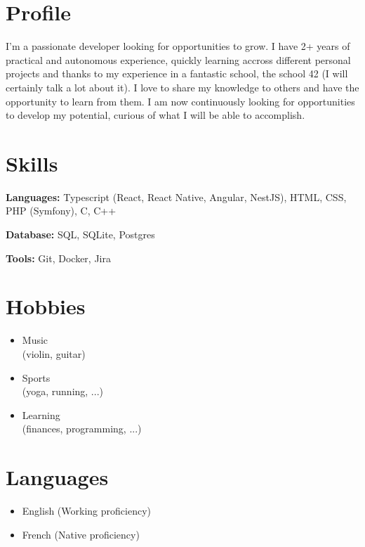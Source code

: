 \documentclass[11pt, oneside, a4paper, titlepage]{article}
\begin{document}
\vspace*{0.5cm}
\begin{tcolorbox}[colframe=white, colback=white]

  \begin{minipage}[t]{0.35\linewidth}

    \section*{Profile}
    I'm a passionate developer looking for
    opportunities to grow. I have 2+ years
    of practical and autonomous experience,
    quickly learning accross different 
    personal projects and thanks to my 
    experience in a fantastic school, 
    the school 42 (I will certainly talk
    a lot about it). \medbreak
    I love to share my knowledge to others 
    and have the opportunity to learn from 
    them. \medbreak
    I am now continuously looking for 
    opportunities to develop my potential, 
    curious of what I will be able to 
    accomplish.

    \section*{Skills}

    \small{
      \textbf{Languages: }Typescript (React, React Native, Angular, NestJS), 
      HTML, CSS, PHP (Symfony), C, C++
    }
    \vspace{0.3cm}
    
    \small{
      \textbf{Database: }SQL, SQLite, Postgres
    }
    \vspace{0.3cm}

    \small{
      \textbf{Tools: }Git, Docker, Jira
    }

    \section*{Hobbies}
    \begin{itemize}
      \item{Music \\(violin, guitar)}
      \item{Sports \\(yoga, running, ...)}
      \item{Learning \\(finances, programming, ...)}
    \end{itemize}

    \section*{Languages}
    \begin{itemize}
      \item{English (Working proficiency)}
      \item{French (Native proficiency)}
    \end{itemize}


\end{minipage}
\end{tcolorbox}
\end{document}
